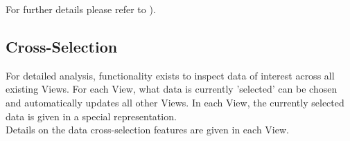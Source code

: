 For further details please refer to ).

\subsection{Cross-Selection}

For detailed analysis, functionality exists to inspect data of interest across all existing Views. For each View, what data is currently 'selected' can be chosen and automatically updates all other Views. In each View, the currently selected data is given in a special representation. \\

Details on the data cross-selection features are given in each View.
